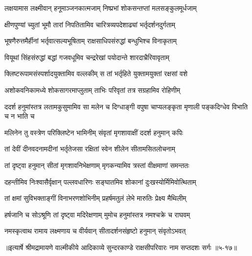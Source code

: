 \twolineshloka
{लक्षयामास लक्ष्मीवान् हनूमाञ्जनकात्मजाम्}
{निष्प्रभां शोकसन्तप्तां मलसङ्कुलमूर्धजाम्} %

\twolineshloka
{क्षीणपुण्यां च्युतां भूमौ तारां निपतितामिव}
{चारित्रव्यपदेशाढ्यां भर्तृदर्शनदुर्गताम्} %

\twolineshloka
{भूषणैरुत्तमैर्हीनां भर्तृवात्सल्यभूषिताम्}
{राक्षसाधिपसंरुद्धां बन्धुभिश्च विनाकृताम्} %

\twolineshloka
{वियूथां सिंहसंरुद्धां बद्धां गजवधूमिव}
{चन्द्ररेखां पयोदान्ते शारदाभ्रैरिवावृताम्} %

\twolineshloka
{क्लिष्टरूपामसंस्पर्शादयुक्तामिव वल्लकीम्}
{स तां भर्तृहिते युक्तामयुक्तां रक्षसां वशे} %

\twolineshloka
{अशोकवनिकामध्ये शोकसागरमाप्लुताम्}
{ताभिः परिवृतां तत्र सग्रहामिव रोहिणीम्} %

\threelineshloka
{ददर्श हनुमांस्तत्र लतामकुसुमामिव}
{सा मलेन च दिग्धाङ्गी वपुषा चाप्यलङ्कृता}
{मृणाली पङ्कदिग्धेव विभाति च न भाति च} %

\twolineshloka
{मलिनेन तु वस्त्रेण परिक्लिष्टेन भामिनीम्}
{संवृतां मृगशावाक्षीं ददर्श हनुमान् कपिः} %

\twolineshloka
{तां देवीं दीनवदनामदीनां भर्तृतेजसा}
{रक्षितां स्वेन शीलेन सीतामसितलोचनाम्} %

\twolineshloka
{तां दृष्ट्वा हनुमान् सीतां मृगशावनिभेक्षणाम्}
{मृगकन्यामिव त्रस्तां वीक्षमाणां समन्ततः} %

\twolineshloka
{दहन्तीमिव निःश्वासैर्वृक्षान् पल्लवधारिणः}
{सङ्घातमिव शोकानां दुःखस्योर्मिमिवोत्थिताम्} %

\twolineshloka
{तां क्षमां सुविभक्ताङ्गीं विनाभरणशोभिनीम्}
{प्रहर्षमतुलं लेभे मारुतिः प्रेक्ष्य मैथिलीम्} %

\twolineshloka
{हर्षजानि च सोऽश्रूणि तां दृष्ट्वा मदिरेक्षणाम्}
{मुमोच हनुमांस्तत्र नमश्चक्रे च राघवम्} %

\twolineshloka
{नमस्कृत्वाथ रामाय लक्ष्मणाय च वीर्यवान्}
{सीतादर्शनसंहृष्टो हनुमान् संवृतोऽभवत्} %


॥इत्यार्षे श्रीमद्रामायणे वाल्मीकीये आदिकाव्ये सुन्दरकाण्डे राक्षसीपरिवारः नाम सप्तदशः सर्गः ॥५-१७॥
